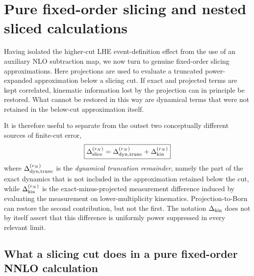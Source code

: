 \documentclass[11pt]{article}
\newcommand{\rn}{r_N}
\begin{document}
\section{Pure fixed-order slicing and nested sliced calculations}
\label{sec:fixed-order-nested-slicing}

Having isolated the higher-cut LHE event-definition effect from the use of an auxiliary NLO subtraction map,
we now turn to genuine fixed-order slicing approximations. Here projections are used to evaluate a truncated
power-expanded approximation below a slicing cut. If exact and projected terms are kept correlated, kinematic
information lost by the projection can in principle be restored. What cannot be restored in this way are
dynamical terms that were not retained in the below-cut approximation itself.

It is therefore useful to separate from the outset two conceptually different sources of finite-cut error,
\begin{equation}
\boxed{
\Delta_{\rm slice}^{(\rn)}
=
\Delta_{\rm dyn,trunc}^{(\rn)}
+
\Delta_{\rm kin}^{(\rn)}
}
\label{eq:fixed-order-pc-decomposition}
\end{equation}
where $\Delta_{\rm dyn,trunc}^{(\rn)}$ is the \emph{dynamical truncation remainder}, namely the part of the
exact dynamics that is not included in the approximation retained below the cut, while
$\Delta_{\rm kin}^{(\rn)}$ is the exact-minus-projected measurement difference induced by evaluating the
measurement on lower-multiplicity kinematics. Projection-to-Born can restore the second contribution, but not
the first. The notation $\Delta_{\rm kin}$ does not by itself assert that this difference is uniformly power
suppressed in every relevant limit.

\subsection{What a slicing cut does in a pure fixed-order NNLO calculation}
\label{subsec:fixed-order-nnlo-slicing}
\end{document}

